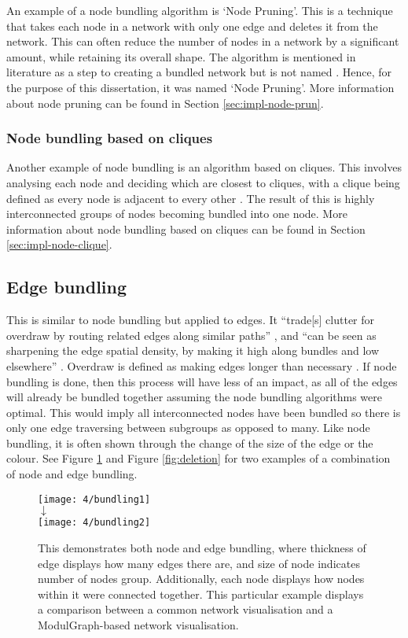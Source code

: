 \documentclass[../dissertation.tex]{subfiles}
\begin{document}
An example of a node bundling algorithm is `Node Pruning'. This is a technique that takes each node in a network with only one edge and deletes it from the network. This can often reduce the number of nodes in a network by a significant amount, while retaining its overall shape. The algorithm is mentioned in literature as a step to creating a bundled network but is not named \cite{brandes2003experiments}. Hence, for the purpose of this dissertation, it was named `Node Pruning'. More information about node pruning can be found in Section \ref{sec:impl-node-prun}.

\subsubsection{Node bundling based on cliques}
\label{sec:node-bundling-cliques}

Another example of node bundling is an algorithm based on cliques. This involves analysing each node and deciding which are closest to cliques, with a clique being defined as every node is adjacent to every other \cite{roberts1971characterization}. The result of this is highly interconnected groups of nodes becoming bundled into one node. More information about node bundling based on cliques can be found in Section \ref{sec:impl-node-clique}.

\subsection{Edge bundling}
\label{sec:edge_bundling}

This is similar to node bundling but applied to edges. It ``trade[s] clutter for overdraw by routing related edges along similar paths'' \cite{hurter2012graph}, and ``can be seen as sharpening the edge spatial density, by making it high along bundles and low elsewhere'' \cite{hurter2012graph}. Overdraw is defined as making edges longer than necessary \cite{gansner2011multilevel}. If node bundling is done, then this process will have less of an impact, as all of the edges will already be bundled together assuming the node bundling algorithms were optimal. This would imply all interconnected nodes have been bundled so there is only one edge traversing between subgroups as opposed to many. Like node bundling, it is often shown through the change of the size of the edge or the colour. See Figure \ref{fig:bundling} and Figure \ref{fig:deletion} for two examples of a combination of node and edge bundling.
\begin{figure}[htb]
    \centering
    \texttt{[image: 4/bundling1]}
    \\$\downarrow$\\
    \texttt{[image: 4/bundling2]}
    \caption{This demonstrates both node and edge bundling, where thickness of edge displays how many edges there are, and size of node indicates number of nodes group. Additionally, each node displays how nodes within it were connected together. This particular example displays a comparison between a common network visualisation and a ModulGraph-based network visualisation. \cite{li2015modulgraph}}
    \label{fig:bundling}
\end{figure}
\end{document}
